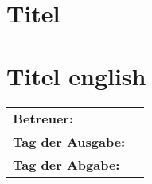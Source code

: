 \section*{Titel}

\section*{Titel english}


\vfill

\begin{tabular}{ll}
	\bfseries Betreuer: & \parbox[t]{10cm}{\betreuer }\vspace{5mm} \\
	\bfseries Tag der Ausgabe: &  \\
	\bfseries Tag der Abgabe: &  \\
\end{tabular}
